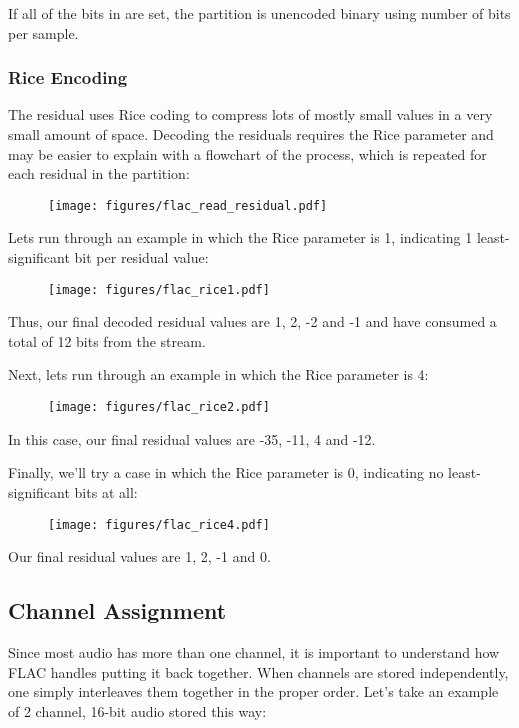 If all of the bits in  are set,
the partition is unencoded binary using  number of bits per
sample.


\clearpage

\subsubsection{Rice Encoding}
The residual uses Rice coding to compress lots of mostly small values
in a very small amount of space.
Decoding the residuals requires the Rice parameter
and may be easier to explain with a flowchart of the process,
which is repeated for each residual in the partition:
\begin{figure}[h]
\texttt{[image: figures/flac\_read\_residual.pdf]}
\end{figure}

\clearpage

Lets run through an example in which the Rice parameter is 1,
indicating 1 least-significant bit per residual value:
\begin{figure}[h]
\texttt{[image: figures/flac\_rice1.pdf]}
\end{figure}
\par
\noindent
Thus, our final decoded residual values are 1, 2, -2 and -1 and have
consumed a total of 12 bits from the stream.

Next, lets run through an example in which the Rice parameter is 4:
\begin{figure}[h]
\texttt{[image: figures/flac\_rice2.pdf]}
\end{figure}
\par
\noindent
In this case, our final residual values are -35, -11, 4 and -12.

Finally, we'll try a case in which the Rice parameter is 0,
indicating no least-significant bits at all:
\begin{figure}[h]
\texttt{[image: figures/flac\_rice4.pdf]}
\end{figure}
\par
Our final residual values are 1, 2, -1 and 0.

\clearpage

\subsection{Channel Assignment}
\label{flac_channels}
Since most audio has more than one channel, it is important to
understand how FLAC handles putting it back together.
When channels are stored independently, one simply interleaves
them together in the proper order.
Let's take an example of 2 channel, 16-bit audio stored this way:

